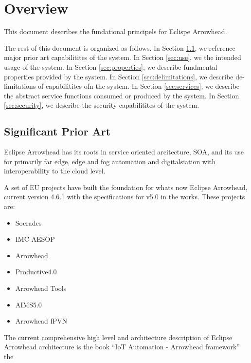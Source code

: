 \message{ !name(GSoSD_foundational principle developments.tex)}\documentclass[a4paper]{arrowhead}
\begin{document}
\newpage

\tableofcontents
\newpage

\section{Overview}
\label{sec:overview}
This document describes the fundational principels for Eclispe
Arrowhead. 

The rest of this document is organized as follows.
In Section \ref{sec:prior_art}, we reference major prior art capabilitites
of the system.
In Section \ref{sec:use}, we the intended usage of the system.
In Section \ref{sec:properties}, we describe fundmental properties
provided by the system.
In Section \ref{sec:delimitations}, we describe de-limitations of capabilitites
ofn the system.
In Section \ref{sec:services}, we describe the abstract service
functions consumed or produced by the system.
In Section \ref{sec:security}, we describe the security capabilitites
of the system.

\newpage

\subsection{Significant Prior Art}
\label{sec:prior_art}

Eclipse Arrowhead has its roots in service oriented arcitecture, SOA,
and its use for primarily far edge, edge and fog automation and
digitalsiation with interoperability to the cloud level.

A set of EU projects have built the foundation for whats now Eclipse
Arrowhead, current version 4.6.1 with the specifications for v5.0 in
the works. These projects are:
\begin{itemize}
\item Socrades
\item IMC-AESOP
\item Arrowhead
\item Productive4.0
\item Arrowhead Tools
\item AIMS5.0
\item Arrowhead fPVN
\end{itemize}

 The current comprehensive high level and architecture description of
 Eclipse Arrowhead architecture is the book ``IoT Automation -
 Arrowhead framework'' the  
\end{document}
